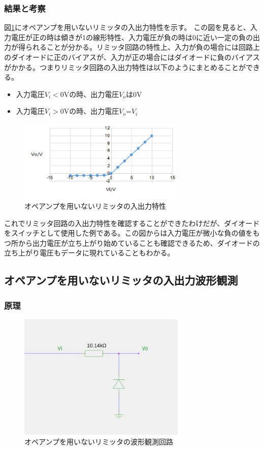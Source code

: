 \documentclass[11pt,a4j]{jsarticle}
\begin{document}
   \subsubsection{結果と考察}
    図\ref{fig:1_1_noamp_PS}にオペアンプを用いないリミッタの入出力特性を示す。
    この図を見ると、入力電圧が正の時は傾きが1の線形特性、入力電圧が負の時は0に近い一定の負の出力が得られることが分かる。リミッタ回路の特性上、入力が負の場合には回路上のダイオードに正のバイアスが、入力が正の場合にはダイオードに負のバイアスがかかる。つまりリミッタ回路の入出力特性は以下のようにまとめることができる。
    \begin{itemize}
    \item 入力電圧$V_i < 0$Vの時、出力電圧$V_o$は0V
    \item 入力電圧$V_i > 0$Vの時、出力電圧$V_o$=$V_i$
    \end{itemize}
    
    
    \begin{figure}[htbp]
  \centering
  \includegraphics[width=8cm,clip]{1_1_noamp_PS.png}
  \caption{オペアンプを用いないリミッタの入出力特性}
  \label{fig:1_1_noamp_PS}
 \end{figure}%
    
    これでリミッタ回路の入出力特性を確認することができたわけだが、ダイオードをスイッチとして使用した例である。この図からは入力電圧が微小な負の値をもつ所から出力電圧が立ち上がり始めていることも確認できるため、ダイオードの立ち上がり電圧もデータに現れていることもわかる。
    
  \subsection{オペアンプを用いないリミッタの入出力波形観測}
   \subsubsection{原理}
    
    \begin{figure}[htbp]
  \centering
  \includegraphics[width=8cm,clip]{noamp_wave.png}
  \caption{オペアンプを用いないリミッタの波形観測回路}
  \label{fig:noamp_wave}
 \end{figure}%
    
\end{document}
